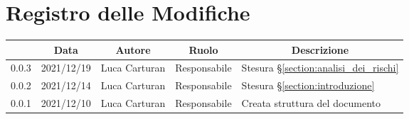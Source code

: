 \thispagestyle{empty}
\section*{Registro delle Modifiche}

\begin{center}
	\renewcommand{\arraystretch}{1.8}
	\begin{longtable}[c]{c | c | c | c | p{5cm}}
		\rowcolor[HTML]{125E28}
		\multicolumn{1}{c}{\color[HTML]{FFFFFF} \textbf{Versione}} & 
		\multicolumn{1}{c}{\color[HTML]{FFFFFF} \textbf{Data}} & 
		\multicolumn{1}{c}{\color[HTML]{FFFFFF} \textbf{Autore}} & 
		\multicolumn{1}{c}{\color[HTML]{FFFFFF} \textbf{Ruolo}} & 
		\multicolumn{1}{c}{\color[HTML]{FFFFFF} \textbf{Descrizione}} \\
		\endhead
		0.0.3 & 2021/12/19 & Luca Carturan & Responsabile & Stesura §\ref{section:analisi_dei_rischi}\\
		0.0.2 & 2021/12/14 & Luca Carturan & Responsabile & Stesura §\ref{section:introduzione}\\
		0.0.1 & 2021/12/10 & Luca Carturan & Responsabile & Creata struttura del documento\\

	\end{longtable}
\end{center}